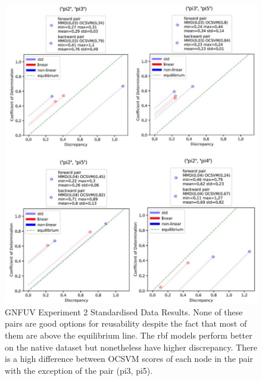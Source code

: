 \documentclass{mpaper}
\begin{document}
\begin{figure}[]
    \begin{center}
        \includegraphics[scale = 0.5]{experiment_2_std.jpg}
    \end{center}
    \caption{GNFUV Experiment 2 Standardised Data Results. None of these pairs are good options for reusability despite the fact that most of them are above the equilibrium line. The rbf models perform better on the native dataset but nonetheless have higher discrepancy. There is a high difference between OCSVM scores of each node in the pair with the exception of the pair (pi3, pi5).}
    \label{fig:gnfuv_exp2_std}
\end{figure}
\end{document}
